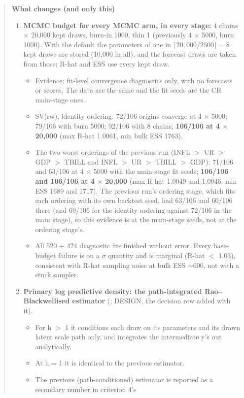 \begin{quote}
\medskip\noindent\textbf{What changes (and only this)}
\begin{enumerate}
\item \textbf{MCMC budget for every MCMC arm, in every stage:} 4 chains $\times$ 20,000 kept draws,
burn-in 1000, thin 1 (previously 4 $\times$ 5000, burn 1000). With the default 
the parameters of one in $\lceil 20{,}000 / 2500\rceil = 8$ kept draws are stored (10,000 in all), and
the forecast draws are taken from those; R-hat and ESS use every kept draw.
\begin{itemize}
\item Evidence: fit-level convergence diagnostics only, with no forecasts or scores. The data are the
same and the fit seeds are the CR main-stage ones.
\item SV(rw), identity ordering: 72/106 origins converge at 4 $\times$ 5000; 79/106 with burn 5000;
92/106 with 8 chains; \textbf{106/106 at 4 $\times$ 20,000} (max R-hat 1.0061, min bulk ESS 1763).
\item The two worst orderings of the previous run (INFL $>$ UR $>$ GDP $>$ TBILL and INFL $>$ UR $>$
TBILL $>$ GDP): 71/106 and 63/106 at 4 $\times$ 5000 with the main-stage fit seeds;
\textbf{106/106 and 106/106 at 4 $\times$ 20,000} (max R-hat 1.0049 and 1.0046, min ESS 1689 and
1717). The previous run's ordering stage, which fits each ordering with its own backtest seed, had
63/106 and 60/106 there (and 69/106 for the identity ordering against 72/106 in the main stage), so
this evidence is at the main-stage seeds, not at the ordering stage's.
\item All 520 + 424 diagnostic fits finished without error. Every base-budget failure is on a
$\sigma$ quantity and is marginal (R-hat $<$ 1.03), consistent with R-hat sampling noise at bulk ESS
$\sim$600, not with a stuck sampler.
\end{itemize}
\item \textbf{Primary log predictive density: the path-integrated Rao--Blackwellised estimator}
(; DESIGN, the decision row added with it).
\begin{itemize}
\item For h $>$ 1 it conditions each draw on its parameters and its drawn latent scale path only,
and integrates the intermediate y's out analytically.
\item At h = 1 it is identical to the previous estimator.
\item The previous (path-conditioned) estimator is reported as a secondary number in criterion 4's

\end{itemize}
\end{enumerate}
\end{quote}
